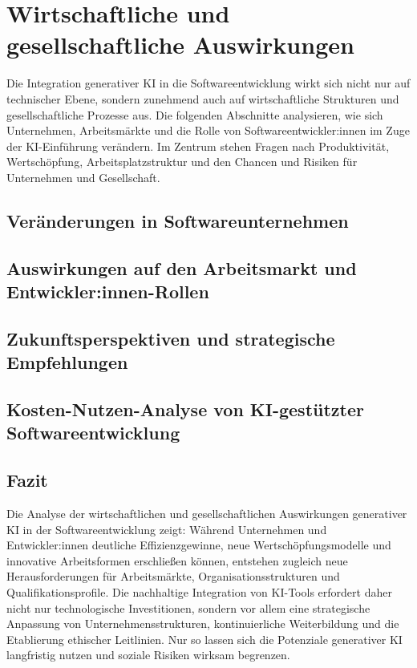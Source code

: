 \chapter{Wirtschaftliche und gesellschaftliche Auswirkungen}
\label{chap:wirtschaftliche_und_gesellschaftliche_auswirkungen}
Die Integration generativer KI in die Softwareentwicklung wirkt sich nicht nur auf technischer Ebene, sondern zunehmend auch auf wirtschaftliche Strukturen und gesellschaftliche Prozesse aus. Die folgenden Abschnitte analysieren, wie sich Unternehmen, Arbeitsmärkte und die Rolle von Softwareentwickler:innen im Zuge der KI-Einführung verändern. Im Zentrum stehen Fragen nach Produktivität, Wertschöpfung, Arbeitsplatzstruktur und den Chancen und Risiken für Unternehmen und Gesellschaft.

\section{Veränderungen in Softwareunternehmen}


\section{Auswirkungen auf den Arbeitsmarkt und Entwickler:innen-Rollen}


\section{Zukunftsperspektiven und strategische Empfehlungen}


\section{Kosten-Nutzen-Analyse von KI-gestützter Softwareentwicklung}


\section{Fazit}

Die Analyse der wirtschaftlichen und gesellschaftlichen Auswirkungen
generativer KI in der Softwareentwicklung zeigt: Während Unternehmen und
Entwickler:innen deutliche Effizienzgewinne, neue Wertschöpfungsmodelle und
innovative Arbeitsformen erschließen können, entstehen zugleich neue
Herausforderungen für Arbeitsmärkte, Organisationsstrukturen und
Qualifikationsprofile. Die nachhaltige Integration von KI-Tools erfordert daher
nicht nur technologische Investitionen, sondern vor allem eine strategische
Anpassung von Unternehmensstrukturen, kontinuierliche Weiterbildung und die
Etablierung ethischer Leitlinien. Nur so lassen sich die Potenziale generativer
KI langfristig nutzen und soziale Risiken wirksam begrenzen.

